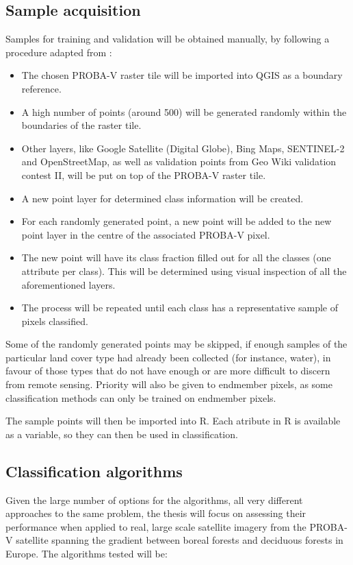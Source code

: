 \documentclass[a4paper,10pt]{article}
\begin{document}
\subsection{Sample acquisition}

Samples for training and validation will be obtained manually, by following a procedure adapted from \cite{defries1998training}:
\begin{itemize}
 \item The chosen PROBA-V raster tile will be imported into QGIS as a boundary reference.
 \item A high number of points (around 500) will be generated randomly within the boundaries of the raster tile.
 \item Other layers, like Google Satellite (Digital Globe), Bing Maps, SENTINEL-2 and OpenStreetMap, as well as validation points from Geo Wiki validation contest II, will be put on top of the PROBA-V raster tile.
 \item A new point layer for determined class information will be created.
 \item For each randomly generated point, a new point will be added to the new point layer in the centre of the associated PROBA-V pixel.
 \item The new point will have its class fraction filled out for all the classes (one attribute per class). This will be determined using visual inspection of all the aforementioned layers.
 \item The process will be repeated until each class has a representative sample of pixels classified.
\end{itemize}

Some of the randomly generated points may be skipped, if enough samples of the particular land cover type had already been collected (for instance, water), in favour of those types that do not have enough or are more difficult to discern from remote sensing. Priority will also be given to endmember pixels, as some classification methods can only be trained on endmember pixels.

The sample points will then be imported into R. Each atribute in R is available as a variable, so they can then be used in classification.

\subsection{Classification algorithms}

Given the large number of options for the algorithms, all very different approaches to the same problem, the thesis will focus on assessing their performance when applied to real, large scale satellite imagery from the PROBA-V satellite spanning the gradient between boreal forests and deciduous forests in Europe. The algorithms tested will be:
\end{document}
